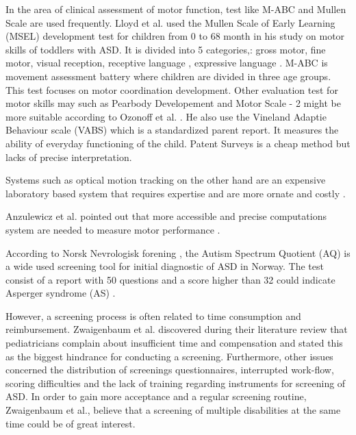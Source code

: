 In the area of clinical assessment of motor function, test like M-ABC and Mullen Scale are used frequently. 
Lloyd et al. used the Mullen Scale of Early Learning (MSEL) development test for children from 0 to 68 month in his study on motor skills of toddlers with ASD. It is divided into 5 categories,: gross motor, fine motor, visual reception,  receptive language , expressive language \cite{Lloyd2013}.
M-ABC is movement assessment battery where children are divided in three age groups. This test focuses on  motor coordination development.  
Other evaluation test for  motor skills may such as  Pearbody Developement and Motor Scale - 2 might be more suitable according to Ozonoff et al. \cite{Ozonoff2008}. 
He also use the Vineland Adaptie Behaviour scale (VABS) which is a standardized parent report. It measures the ability of everyday functioning of the child. Patent Surveys is a cheap method but lacks of precise interpretation.

Systems such as optical motion tracking on the other hand are an expensive laboratory based system that requires expertise and are more ornate and costly \cite{Anzulewicz2016}. 

Anzulewicz et al. pointed out that more accessible and precise computations system are needed to measure motor performance \cite{Anzulewicz2016}.


According to Norsk Nevrologisk forening \cite{nevrolegehandboka2016}, the Autism Spectrum Quotient (AQ) is a wide used screening tool for initial diagnostic of ASD in Norway. The test consist of a report with 50 questions and a score higher than 32 could indicate Asperger syndrome (AS) .

However, a screening process is often related to time consumption and reimbursement. Zwaigenbaum et al. \cite{Zwaigenbaum2015} discovered during their literature review that pediatricians complain about insufficient time and compensation and stated this as the biggest hindrance for conducting a screening. Furthermore, other issues concerned the distribution of screenings questionnaires, interrupted work-flow, scoring difficulties and the lack of training regarding instruments for  screening of ASD. In order to gain more acceptance and a regular screening routine, Zwaigenbaum et al., believe that a  screening of multiple disabilities at the same time could be of great interest.






